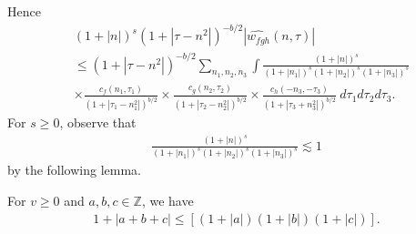 \documentclass[handout]{beamer}
\numberwithin{equation}{section}
\newcommand{\zz}{\mathbb{Z}}
\newcommand{\wh}{\widehat}
\begin{document}
\begin{frame}
%
%
Hence
%
%
\begin{equation}
	\label{convo-est-starting-pnt}
	\begin{split}
		 & \left(1 + |n| \right)^s \left( 1 + | \tau - n^{2 } | \right)^{-b/2} | \wh{w_{fgh}}\left( 
		n, \tau \right) |
		\\
		& \le \left( 1 + | \tau - n^{2 } | \right)^{-b/2}
		\sum_{n_1, n_2, n_3} \int \frac{\left(1 + |n| \right)^s}{\left(1 + |n_1|
		\right)^s \left( 1 + | n_2 
				|\right)^s \left(1 + |n_3| \right)^s} 
		\\
		& \times \frac{c_f(n_1, \tau_1)}{\left( 1 + | \tau_1 - n_1^{2 } | 
		\right)^{b/2}}
		\times
		\frac{c_g(n_2, \tau_2)}{\left( 1 + | \tau_2 - n_2^{2 } | 
		\right)^{b/2}} \times
		\frac{c_h(-n_3, -\tau_3)}{\left( 1 + | \tau_3 + n_3^{2 } | 
		\right)^{b/2}}\ d \tau_1 d \tau_2 d \tau_3.
	\end{split}
\end{equation}
%
%
For $s \ge 0$, observe that
%
%
\begin{equation}
	\label{deriv-bound-easy-s}
	\begin{split}
		\frac{\left(1 + |n| \right) ^s}{\left(1 + |n_1| \right) ^s
		\left(1 + |n_2| \right) ^s \left(1 + |n_3| \right) ^s} 
		\lesssim 1
	\end{split}
\end{equation}
%
%
by the following lemma.

\end{frame}
%
%
%
\begin{frame}

\begin{lemma}
	\label{lem:splitting}
	For $v \ge 0$ and $a, b, c \in \zz$, we have 
%
%
\begin{equation*}
	\label{splitting}
	\begin{split}
		1 + | a + b + c | \le \left[ \left( 1 + | a | \right)\left( 1 + | b |
		\right) \left( 1 + | c | \right) \right].
	\end{split}
\end{equation*}
%
%
%
%
\end{lemma}

\end{frame}
%
%
%
%
\end{document}
